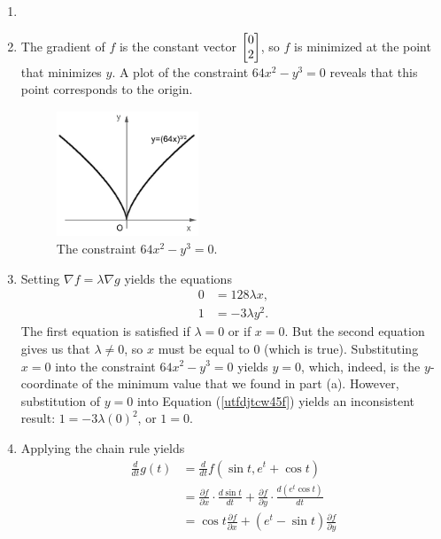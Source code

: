 \documentclass{article}
\begin{document}
\begin{enumerate}
\item %
\BEN
\item The gradient of $f$ is the constant vector $\begin{bmatrix} 0 \\ 2 \end{bmatrix}$, so $f$ is minimized at the point that minimizes $y$. A plot of the constraint $64x^2-y^3=0$ reveals that this point corresponds to the origin. 
\begin{figure}[H]
  \begin{center}
    \includegraphics[width=0.4\textwidth]{Mid2Curve.pdf}
      \caption{\small{The constraint $64x^2-y^3=0$.}}
  \end{center}
\end{figure}
\item Setting $\nabla f = \lambda \nabla g$ yields the equations
\begin{align}
  0 &=128 \lambda x , \\
  1 &=-3\lambda y^2 . \label{utfdjtcw45f}
\end{align}
The first equation is satisfied if $\lambda=0$ or if $x=0$. But the second equation gives us that $\lambda \ne 0$, so $x$ must be equal to 0 (which is true). Substituting $x=0$ into the constraint $64x^2-y^3=0$ yields $y=0$, which, indeed, is the $y$-coordinate of the minimum value that we found in part (a). However, substitution of $y=0$ into Equation (\ref{utfdjtcw45f}) yields an inconsistent result: $1 = -3\lambda (0)^2$, or $1=0$. 
\EEN
\item %
Applying the chain rule yields
\begin{align*}
  \frac{d}{dt}g(t)
  &=\frac{d}{dt} f(\sin t, e^t+\cos t) \\
  &= \frac{\partial f}{\partial x}\cdot\frac{d \sin t}{d t} +  \frac{\partial f}{\partial y}\cdot\frac{d (e^t \cos t)}{d t} \\
  &= \cos t\frac{\partial f}{\partial x} +  (e^t - \sin t) \frac{\partial f}{\partial y}
\end{align*}


\end{enumerate}
\end{document}
